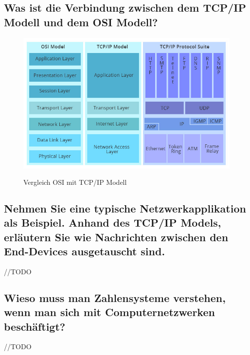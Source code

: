 \subsection*{Was ist die Verbindung zwischen dem TCP/IP Modell und dem OSI Modell?}
\begin{figure}[H]
    \begin{center}
    \label{pic:osi_tcpip}
    \includegraphics[width=\textwidth]{images/osi_tcpip.jpg}
    \caption[Vergleich OSI mit TCP/IP Modell]{Vergleich OSI mit TCP/IP Modell\footnotemark}
    \end{center}
\end{figure}
\subsection*{Nehmen Sie eine typische Netzwerkapplikation als Beispiel. Anhand des TCP/IP Models, erläutern Sie wie Nachrichten zwischen den End-Devices ausgetauscht sind.}
//TODO
\subsection*{Wieso muss man Zahlensysteme verstehen, wenn man sich mit Computernetzwerken beschäftigt?}
//TODO
